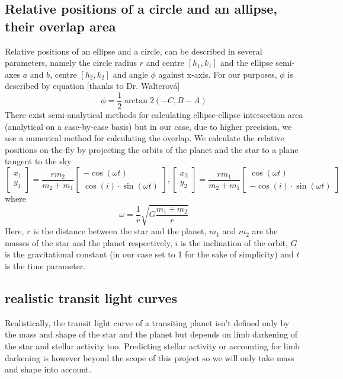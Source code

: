 \documentclass[10pt]{article}
\numberwithin{equation}{subsection}
\begin{document}
\subsection{Relative positions of a circle and an allipse, their overlap area}
Relative positions of an ellipse and a circle, can be described
in several parameters, namely the circle radius $r$ and centre $[h_1, k_1]$ and the
ellipse semi-axes $a$ and $b$, centre $[h_2, k_2]$ and angle $\phi$ against x-axis. For
our purposes, $\phi$ is described by equation \cite{correia1} [thanks to Dr. Walterová]
\begin{equation}
  \phi = \frac{1}{2}\arctan 2(-C, B-A)
  \label{eq:phi}
\end{equation}
There exist semi-analytical methods for calculating ellipse-ellipse intersection area
(analytical on a case-by-case basis) \cite{eeover} but in our case, due to higher
precision, we use a numerical method for calculating the overlap.
We calculate the relative positions on-the-fly by projecting the orbits of the planet
and the star to a plane tangent to the sky
\begin{equation}
  \begin{bmatrix}
    x_1 \\
    y_1 
  \end{bmatrix}
  = \frac{rm_2}{m_2+m_1}
  \begin{bmatrix}
    -\cos(\omega t) \\
    \cos(i)\cdot\sin(\omega t)
  \end{bmatrix},
  \begin{bmatrix}
    x_2 \\
    y_2 
  \end{bmatrix}
  = \frac{rm_1}{m_2+m_1}
  \begin{bmatrix}
    \cos(\omega t) \\
    -\cos(i)\cdot\sin(\omega t)
  \end{bmatrix}
  \label{eq:projected-orbit}
\end{equation}
where
\begin{equation}
  \omega = \frac{1}{r}\sqrt{G\frac{m_1 + m_2}{r}}
  \label{eq:omega}
\end{equation}
Here, $r$ is the distance between the star and the planet, $m_1$ and $m_2$ are the masses
of the star and the planet respectively, $i$ is the inclination of the orbit, $G$ is the
gravitational constant (in our case set to 1 for the sake of simplicity) and $t$ is the
time parameter.
\subsection{realistic transit light curves}
Realistically, the transit light curve of a transiting planet isn't defined only by
the mass and shape of the star and the planet but depends on limb darkening of the star
and stellar activity too. Predicting stellar activity or accounting for limb darkening
is however beyond the scope of this project so we will only take mass and shape into
account.
\end{document}
